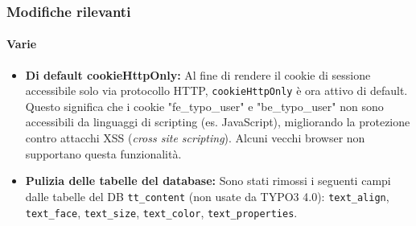 \begin{frame}[fragile]
	\frametitle{Modifiche rilevanti}
	\framesubtitle{Varie}

	\begin{itemize}

		\item \textbf{Di default cookieHttpOnly:}\newline
			\small
				Al fine di rendere il cookie di sessione accessibile solo via protocollo HTTP, \texttt{cookieHttpOnly} è ora attivo di default.\newline
				Questo significa che i cookie "fe\_typo\_user" e "be\_typo\_user" non sono accessibili da linguaggi di scripting (es. JavaScript), migliorando la protezione contro attacchi XSS (\textit{cross site scripting}). Alcuni vecchi browser non supportano questa funzionalità.
			\normalsize

                \item \textbf{Pulizia delle tabelle del database:}\newline
                        \small
                                Sono stati rimossi i seguenti campi dalle tabelle del DB \texttt{tt\_content} (non usate da TYPO3 4.0):
                                \texttt{text\_align}, \texttt{text\_face}, \texttt{text\_size}, \texttt{text\_color}, \texttt{text\_properties}.
                        \normalsize

	\end{itemize}
	
\end{frame}




